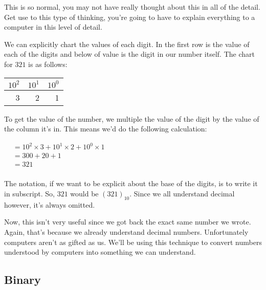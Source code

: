 This is so normal, you may not have really thought about this in all of the
detail. Get use to this type of thinking, you're going to have to explain
everything to a computer in this level of detail.

We can explicitly chart the values of each digit. In the first row is the value
of each of the digits and below of value is the digit in our number itself. The
chart for $321$ is as follows:

\begin{center}
  \begin{tabular}{r | r | r}
    $10^2$ & $10^1$ & $10^0$ \\
    \hline
         3 &      2 &      1 \\
  \end{tabular}
\end{center}

To get the value of the number, we multiple the value of the digit by the value
of the column it's in. This means we'd do the following calculation:

\begin{center}
  \begin{math}
    \begin{aligned}
&= 10^2 \times 3 + 10^1 \times 2 + 10^0 \times 1 \\
&= 300 + 20 + 1 \\
&= 321 \\
    \end{aligned}
  \end{math}
\end{center}

The notation, if we want to be explicit about the base of the digits, is to
write it in subscript. So, $321$ would be $(321)_{10}$. Since we all understand
decimal however, it's always omitted.

Now, this isn't very useful since we got back the exact same number we wrote.
Again, that's because we already understand decimal numbers. Unfortunately
computers aren't as gifted as us. We'll be using this technique to convert
numbers understood by computers into something we can understand.

\label{sec:numeral-system-binary}
\subsection{Binary}

